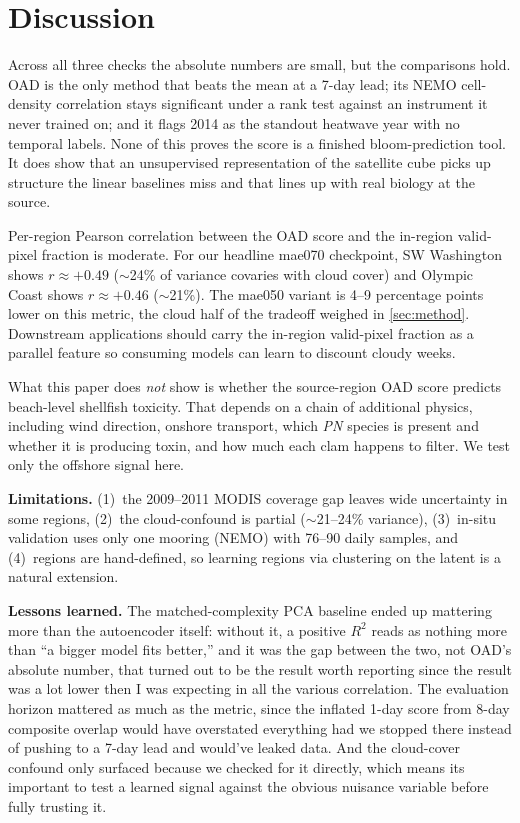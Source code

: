 \documentclass[10pt,twocolumn,letterpaper]{article}
\begin{document}
\FloatBarrier

\section{Discussion}
\label{sec:discussion}

Across all three checks the absolute numbers are small, but the comparisons hold. OAD is the only method that beats the mean at a 7-day lead; its NEMO cell-density correlation stays significant under a rank test against an instrument it never trained on; and it flags 2014 as the standout heatwave year with no temporal labels. None of this proves the score is a finished bloom-prediction tool. It does show that an unsupervised representation of the satellite cube picks up structure the linear baselines miss and that lines up with real biology at the source.

Per-region Pearson correlation between the OAD score and the in-region valid-pixel fraction is moderate. For our headline mae070 checkpoint, SW Washington shows $r \approx +0.49$ ($\sim$24\% of variance covaries with cloud cover) and Olympic Coast shows $r \approx +0.46$ ($\sim$21\%). The mae050 variant is 4--9 percentage points lower on this metric, the cloud half of the tradeoff weighed in \cref{sec:method}. Downstream applications should carry the in-region valid-pixel fraction as a parallel feature so consuming models can learn to discount cloudy weeks.

What this paper does \emph{not} show is whether the source-region OAD score predicts beach-level shellfish toxicity. That depends on a chain of additional physics, including wind direction, onshore transport, which \textit{PN} species is present and whether it is producing toxin, and how much each clam happens to filter. We test only the offshore signal here.

\textbf{Limitations.} (1)~the 2009--2011 MODIS coverage gap leaves wide uncertainty in some regions, (2)~the cloud-confound is partial ($\sim$21--24\% variance), (3)~in-situ validation uses only one mooring (NEMO) with 76--90 daily samples, and (4)~regions are hand-defined, so learning regions via clustering on the latent is a natural extension.

\textbf{Lessons learned.} The matched-complexity PCA baseline ended up mattering more than the autoencoder itself: without it, a positive $R^2$ reads as nothing more than ``a bigger model fits better,'' and it was the gap between the two, not OAD's absolute number, that turned out to be the result worth reporting since the result was a lot lower then I was expecting in all the various correlation. The evaluation horizon mattered as much as the metric, since the inflated 1-day score from 8-day composite overlap would have overstated everything had we stopped there instead of pushing to a 7-day lead and would've leaked data. And the cloud-cover confound only surfaced because we checked for it directly, which means its important to test a learned signal against the obvious nuisance variable before fully trusting it.
\end{document}
